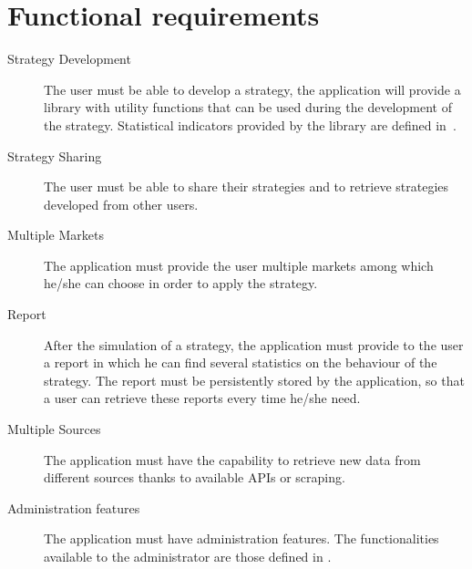 \section{Functional requirements}\label{sec:functionalrequirements}

\begin{description}
	\item[Strategy Development] The user must be able to develop a strategy,
		the application will provide a library with utility functions
		that can be used during the development of the strategy.
		Statistical indicators provided by the library are defined
		in~.
	\item[Strategy Sharing] The user must be able to share their strategies
		and to retrieve strategies developed from other users.
	\item[Multiple Markets] The application must provide the user multiple
		markets among which he/she can choose in order to apply the
		strategy.
	\item[Report] After the simulation of a strategy, the application must
		provide to the user a report in which he can find several
		statistics on the behaviour of the strategy. The report must be
		persistently stored by the application, so that a user can
		retrieve these reports every time he/she need.
	\item[Multiple Sources] The application must have the capability to
		retrieve new data from different sources thanks to available
		APIs or scraping.
	\item[Administration features] The application must have
		administration features. The functionalities available to the
		administrator are those defined in .
\end{description}
